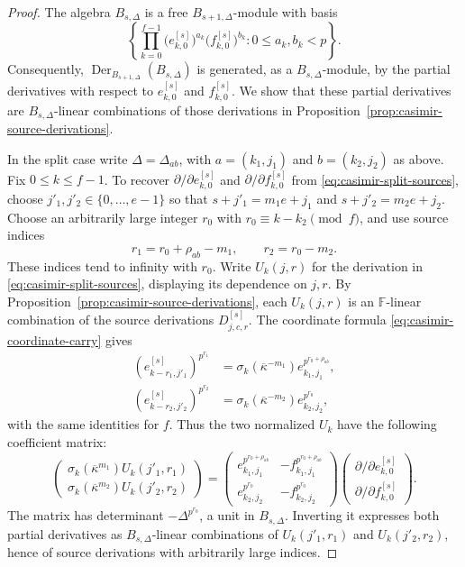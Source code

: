 \documentclass[11pt]{article}
\numberwithin{equation}{section}
\theoremstyle{definition}
\theoremstyle{remark}
\newcommand{\F}{\mathbb F}
\DeclareMathOperator{\Der}{Der}
\begin{document}
\begin{proof}
The algebra $B_{s,\Delta}$ is a free $B_{s+1,\Delta}$-module with basis
\[
 \left\{\prod_{k=0}^{f-1}
       \bigl(e_{k,0}^{[s]}\bigr)^{a_k}
       \bigl(f_{k,0}^{[s]}\bigr)^{b_k}
       : 0\leq a_k,b_k<p\right\}.
\]
Consequently, $\Der_{B_{s+1,\Delta}}(B_{s,\Delta})$ is generated,
as a $B_{s,\Delta}$-module, by the partial derivatives with respect to
$e_{k,0}^{[s]}$ and $f_{k,0}^{[s]}$. We show that these partial derivatives are
$B_{s,\Delta}$-linear combinations of those derivations in 
Proposition~\ref{prop:casimir-source-derivations}.

In the split case write $\Delta=\Delta_{ab}$, with
$a=(k_1,j_1)$ and $b=(k_2,j_2)$ as above.
Fix $0\leq k\leq f-1$. To recover
$\partial/\partial e_{k,0}^{[s]}$ and
$\partial/\partial f_{k,0}^{[s]}$ from
\eqref{eq:casimir-split-sources}, choose
$j'_1,j'_2\in\{0,\ldots,e-1\}$ so that
$s+j'_1=m_1e+j_1$ and $s+j'_2=m_2e+j_2$.
Choose an arbitrarily large integer $r_0$ with
$r_0\equiv k-k_2\pmod f$, and use source indices
\[
 r_1=r_0+\rho_{ab}-m_1,\qquad r_2=r_0-m_2.
\]
These indices tend to infinity with $r_0$. Write $U_k(j,r)$ for
the derivation in \eqref{eq:casimir-split-sources}, displaying
its dependence on $j,r$. By
Proposition~\ref{prop:casimir-source-derivations}, each $U_k(j,r)$
is an $\F$-linear combination of the source derivations
$D^{[s]}_{j,c,r}$. The coordinate formula
\eqref{eq:casimir-coordinate-carry} gives
\[
 \begin{aligned}
 (e_{k-r_1,j'_1}^{[s]})^{p^{r_1}}
 &=\sigma_k(\overline\kappa^{-m_1})e_{k_1,j_1}^{p^{r_0+\rho_{ab}}},\\
 (e_{k-r_2,j'_2}^{[s]})^{p^{r_2}}
 &=\sigma_k(\overline\kappa^{-m_2})e_{k_2,j_2}^{p^{r_0}},
 \end{aligned}
\]
with the same identities for $f$. Thus the two normalized
$U_k$ have the following coefficient matrix:
\[
 \begin{pmatrix}
 \sigma_k(\overline\kappa^{m_1})U_k(j'_1,r_1)\\
 \sigma_k(\overline\kappa^{m_2})U_k(j'_2,r_2)
 \end{pmatrix}
 =
 \begin{pmatrix}
 e_{k_1,j_1}^{p^{r_0+\rho_{ab}}}&-f_{k_1,j_1}^{p^{r_0+\rho_{ab}}}\\
 e_{k_2,j_2}^{p^{r_0}}&-f_{k_2,j_2}^{p^{r_0}}
 \end{pmatrix}
 \begin{pmatrix}
 \partial/\partial e_{k,0}^{[s]}\\
 \partial/\partial f_{k,0}^{[s]}
 \end{pmatrix}.
\]
The matrix has determinant $-\Delta^{p^{r_0}}$, a unit in
$B_{s,\Delta}$. Inverting it expresses both partial derivatives
as $B_{s,\Delta}$-linear combinations of $U_k(j'_1,r_1)$ and
$U_k(j'_2,r_2)$, hence of source derivations with arbitrarily
large indices.


\end{proof}
\end{document}
